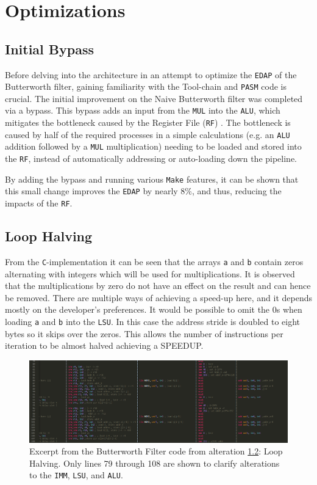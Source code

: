 \documentclass[letterpaper, 10 pt, conference]{ieeeconf}  %
\begin{document}
\section{Optimizations}

\subsection{Initial Bypass}
\label{imp:A}

Before delving into the architecture in an attempt to optimize the \texttt{EDAP} of the Butterworth filter, gaining familiarity with the Tool-chain and \texttt{PASM} code is crucial. The initial improvement on the Naive Butterworth filter was completed via a bypass. This bypass adds an input from the \texttt{MUL} into the \texttt{ALU}, which mitigates the bottleneck caused by the Register File (\texttt{RF}) . The bottleneck is caused by half of the required processes in a simple calculations (e.g. an \texttt{ALU} addition followed by a \texttt{MUL} multiplication) needing to be loaded and stored into the \texttt{RF}, instead of automatically addressing or auto-loading down the pipeline. 

By adding the bypass and running various \texttt{Make} features, it can be shown that this small change improves the \texttt{EDAP} by nearly $8\%$, and thus, reducing the impacts of the \texttt{RF}. 

\subsection{Loop Halving}
\label{imp:B}

From the \texttt{C}-implementation it can be seen that the arrays \texttt{a} and \texttt{b} contain zeros alternating with integers which will be used for multiplications. It is observed that the multiplications by zero do not have an effect on the result and can hence be removed. There are multiple ways of achieving a speed-up here, and it depends mostly on the developer's preferences. It would be possible to omit the $0$s when loading \texttt{a} and \texttt{b} into the \texttt{LSU}. In this case the address stride is doubled to eight bytes so it skips over the zeros. This allows the number of instructions per iteration to be almost halved achieving a SPEEDUP.

\begin{figure}[h]
\begin{center}
\includegraphics[scale=0.265]{images/assem02.png}
\caption{Excerpt from the Butterworth Filter code from alteration \ref{imp:B}: Loop Halving. Only lines 79 through 108 are shown to clarify alterations to the \texttt{IMM}, \texttt{LSU}, and \texttt{ALU}.}
\label{fig:assem02}
\end{center}
\end{figure}
\end{document}
